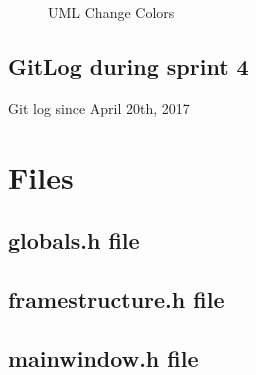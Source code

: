 \documentclass[11pt]{article} %
\begin{document}
{\begin{figure}[H]
	\centering
	\caption{UML Change Colors}
	\label{fig:UML2 }
\end{figure}



\newpage
\subsection{GitLog during sprint 4}
Git log since April 20th, 2017



\newpage
\section{Files}
%

\subsection{globals.h file}


\newpage
\subsection{framestructure.h file}


\newpage
\subsection{mainwindow.h file}



}
\end{document}
